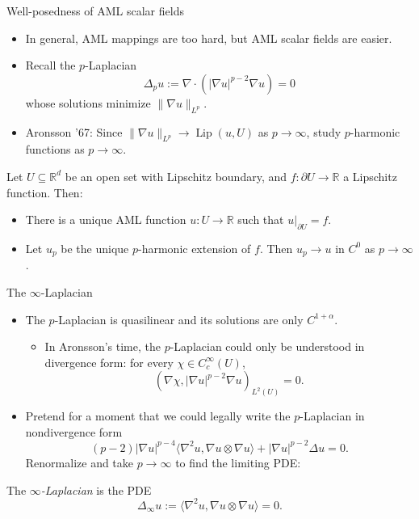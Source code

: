\documentclass[10pt]{beamer}
\newcommand{\RR}{\mathbb{R}}
\DeclareMathOperator{\Lip}{Lip}
\begin{document}
\begin{frame}{Well-posedness of AML scalar fields}
\begin{itemize}
\item In general, AML mappings are too hard, but AML scalar fields are easier. \pause
\item Recall the $p$-Laplacian 
$$\Delta_p u := \nabla \cdot (|\nabla u|^{p - 2} \nabla u) = 0$$
whose solutions minimize $\|\nabla u\|_{L^p}$. \pause
\item Aronsson '67: Since $\|\nabla u\|_{L^p} \to \Lip(u, U)$ as $p \to \infty$, study $p$-harmonic functions as $p \to \infty$. \pause
\end{itemize}

\begin{theorem}
Let $U \subseteq \RR^d$ be an open set with Lipschitz boundary, and $f: \partial U \to \RR$ a Lipschitz function. Then: \pause
\begin{itemize}
\item There is a unique AML function $u: U \to \RR$ such that $u|_{\partial U} = f$. 
\item Let $u_p$ be the unique $p$-harmonic extension of $f$.
Then $u_p \to u$ in $C^0$ as $p \to \infty$.
\end{itemize}
\end{theorem}
\end{frame}

\begin{frame}{The $\infty$-Laplacian}
\begin{itemize}
\item The $p$-Laplacian is quasilinear and its solutions are only $C^{1 + \alpha}$.
\begin{itemize}
\item In Aronsson's time, the $p$-Laplacian could only be understood in divergence form: for every $\chi \in C^\infty_c(U)$,
$$(\nabla \chi, |\nabla u|^{p - 2} \nabla u)_{L^2(U)} = 0.$$
\end{itemize}
\item Pretend for a moment that we could legally write the $p$-Laplacian in nondivergence form 
$$(p - 2) |\nabla u|^{p - 4} \langle \nabla^2 u, \nabla u \otimes \nabla u\rangle + |\nabla u|^{p - 2} \Delta u = 0.$$
Renormalize and take $p \to \infty$ to find the limiting PDE: \pause
\end{itemize} 

\begin{definition}
The \emph{$\infty$-Laplacian} is the PDE 
$$\Delta_\infty u := \langle \nabla^2 u, \nabla u \otimes \nabla u\rangle = 0.$$
\end{definition}
\end{frame}
\end{document}

